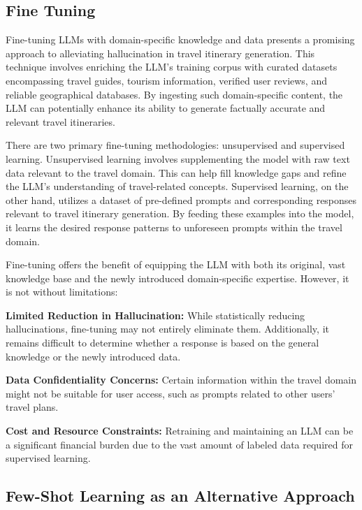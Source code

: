 \documentclass[12pt,a4paper]{report}
\begin{document}
\subsection{Fine Tuning}

Fine-tuning LLMs with domain-specific knowledge and data presents a promising approach to alleviating hallucination in travel itinerary generation. This technique involves enriching the LLM's training corpus with curated datasets encompassing travel guides, tourism information, verified user reviews, and reliable geographical databases. By ingesting such domain-specific content, the LLM can potentially enhance its ability to generate factually accurate and relevant travel itineraries.

There are two primary fine-tuning methodologies: unsupervised and supervised learning. Unsupervised learning involves supplementing the model with raw text data relevant to the travel domain. This can help fill knowledge gaps and refine the LLM's understanding of travel-related concepts. Supervised learning, on the other hand, utilizes a dataset of pre-defined prompts and corresponding responses relevant to travel itinerary generation. By feeding these examples into the model, it learns the desired response patterns to unforeseen prompts within the travel domain. 

Fine-tuning offers the benefit of equipping the LLM with both its original, vast knowledge base and the newly introduced domain-specific expertise. However, it is not without limitations:

\begin{description}
\item{\textbf{Limited Reduction in Hallucination:} While statistically reducing hallucinations, fine-tuning may not entirely eliminate them. Additionally, it remains difficult to determine whether a response is based on the general knowledge or the newly introduced data.}
\item{\textbf{Data Confidentiality Concerns:} Certain information within the travel domain might not be suitable for user access, such as prompts related to other users' travel plans.}
\item{\textbf{Cost and Resource Constraints:} Retraining and maintaining an LLM can be a significant financial burden due to the vast amount of labeled data required for supervised learning.}
\end{description}

\subsection{Few-Shot Learning as an Alternative Approach}
\end{document}
